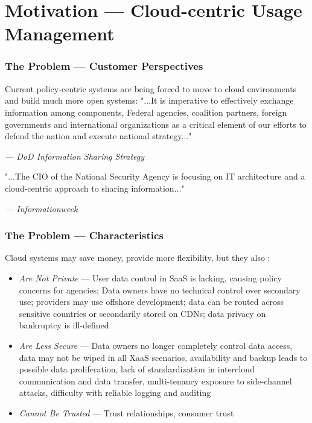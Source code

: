\section{Motivation --- Cloud-centric Usage Management}


\begin{frame}[t]
\frametitle{The Problem --- Customer Perspectives}
Current policy-centric systems are being forced to move to cloud environments and build much more open systems:
\newline
\newline
\newline
"...It is imperative to  effectively exchange information among components, Federal agencies, coalition partners, foreign governments and international organizations as a critical element of our efforts to defend the nation and execute national strategy..."\cite{proposal:info-sharing-strategy}
\newline
\begin{footnotesize}\textit{--- DoD Information Sharing Strategy}\end{footnotesize}
\newline
\newline
\newline
"...The CIO of the National Security Agency is focusing on IT architecture and a cloud-centric approach to sharing information..."\cite{proposal:nsa-cloud}
\newline
\begin{footnotesize}\textit{--- Informationweek}\end{footnotesize}
\end{frame}

\begin{frame}[t]
\frametitle{The Problem --- Characteristics}
Cloud systems may save money, provide more flexibility, but they also \cite{proposal:privacy-security-trust-cloud}:
\begin{itemize}
\item<2-> \textit{Are Not Private} --- User data control in SaaS is lacking, causing policy concerns for agencies; Data owners have no technical control over secondary use; providers may use offshore development; data can be routed across sensitive countries or secondarily stored on CDNs; data privacy on bankruptcy is ill-defined
\item<3-> \textit{Are Less Secure} --- Data owners no longer completely control data access, data may not be wiped in all XaaS scenarios, availability and backup leads to possible data proliferation, lack of standardization in intercloud communication and data transfer, multi-tenancy exposure to side-channel attacks, difficulty with reliable logging and auditing
\item<4-> \textit{Cannot Be Trusted} --- Trust relationships, consumer trust
\end{itemize}
\end{frame}

